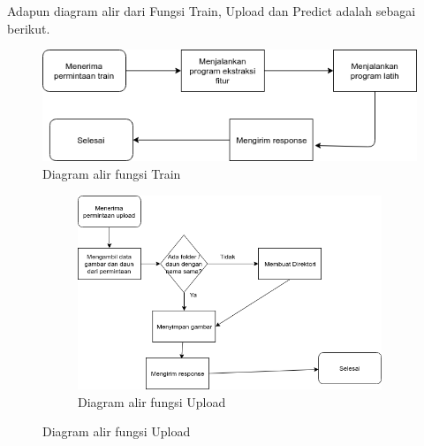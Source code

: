\par Adapun diagram alir dari Fungsi Train, Upload dan Predict adalah sebagai berikut. 
\begin{figure}[H]
	\centering
	\includegraphics[width=1\linewidth]{bab3/figures/train.png}
	\caption{Diagram alir fungsi Train}
	\label{fig:Ng1} 
\end{figure}
\begin{figure}[H]
	\centering
	
	\begin{subfigure}[b]{0.75\textwidth}
		\includegraphics[width=1\linewidth]{bab3/figures/upload.png}
		\caption{Diagram alir fungsi Upload}
		\label{fig:Ng2}
	\end{subfigure}


\end{figure}
